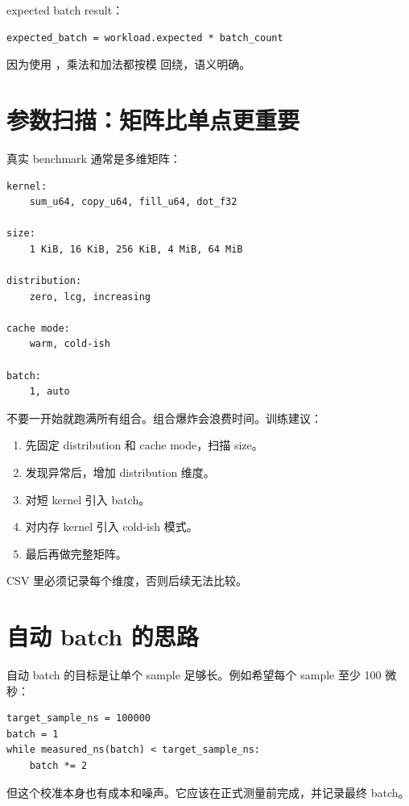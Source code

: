 expected batch result：

\begin{lstlisting}
expected_batch = workload.expected * batch_count
\end{lstlisting}

因为使用 ，乘法和加法都按模  回绕，语义明确。

\section{参数扫描：矩阵比单点更重要}

真实 benchmark 通常是多维矩阵：

\begin{lstlisting}
kernel:
    sum_u64, copy_u64, fill_u64, dot_f32

size:
    1 KiB, 16 KiB, 256 KiB, 4 MiB, 64 MiB

distribution:
    zero, lcg, increasing

cache mode:
    warm, cold-ish

batch:
    1, auto
\end{lstlisting}

不要一开始就跑满所有组合。组合爆炸会浪费时间。训练建议：

\begin{enumerate}
  \item 先固定 distribution 和 cache mode，扫描 size。
  \item 发现异常后，增加 distribution 维度。
  \item 对短 kernel 引入 batch。
  \item 对内存 kernel 引入 cold-ish 模式。
  \item 最后再做完整矩阵。
\end{enumerate}

CSV 里必须记录每个维度，否则后续无法比较。

\section{自动 batch 的思路}

自动 batch 的目标是让单个 sample 足够长。例如希望每个 sample 至少 100 微秒：

\begin{lstlisting}
target_sample_ns = 100000
batch = 1
while measured_ns(batch) < target_sample_ns:
    batch *= 2
\end{lstlisting}

但这个校准本身也有成本和噪声。它应该在正式测量前完成，并记录最终 batch。

